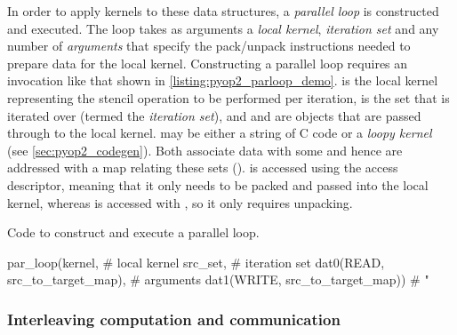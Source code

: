 \documentclass[thesis]{subfiles}
\begin{document}
In order to apply kernels to these data structures, a \emph{parallel loop} is constructed and executed.
The loop takes as arguments a \emph{local kernel}, \emph{iteration set} and any number of \emph{arguments} that specify the pack/unpack instructions needed to prepare data for the local kernel.
Constructing a parallel loop requires an invocation like that shown in \cref{listing:pyop2_parloop_demo}.
 is the local kernel representing the stencil operation to be performed per iteration,  is the set that is iterated over (termed the \emph{iteration set}), and  and  are  objects that are passed through to the local kernel.
 may be either a string of C code or a \emph{loopy kernel} (see \cref{sec:pyop2_codegen}).
Both  associate data with some  and hence are addressed with a map relating these sets ().
 is accessed using the  access descriptor, meaning that it only needs to be packed and passed into the local kernel, whereas  is accessed with , so it only requires unpacking.

\begin{listing}
  \centering
  \caption{Code to construct and execute a  parallel loop.}
  \begin{minipage}{.9\textwidth}
    \begin{pyalg2}
      par_loop(kernel,                          # local kernel
               src_set,                         # iteration set
               dat0(READ, src_to_target_map),   # arguments
               dat1(WRITE, src_to_target_map))  #    "
    \end{pyalg2}
  \end{minipage}
  \label{listing:pyop2_parloop_demo}
\end{listing}


\subsubsection{Interleaving computation and communication}
\label{sec:pyop2_interleave}
\end{document}
